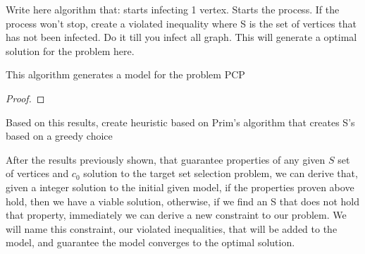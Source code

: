 Write here algorithm that: starts infecting 1 vertex. Starts the process. If the process won't stop, create a violated inequality where S is the set of vertices that has not been infected. Do it till you infect all graph. This will generate a optimal solution for the problem here.
\begin{myprop}
This algorithm generates a model for the problem PCP
\end{myprop}
\begin{proof}

\end{proof}
Based on this results, create heuristic based on Prim's algorithm that creates S's based on a greedy choice 


After the results previously shown, that guarantee properties of any given $S$ set of vertices and $c_0$ solution to the target set selection problem, we can derive that, given a integer solution to the initial given model, if the properties proven above hold, then we have a viable solution, otherwise, if we find an S that does not hold that property, immediately we can derive a new constraint to our problem. We will name this constraint, our violated inequalities, that will be added to the model, and guarantee the model converges to the optimal solution.


